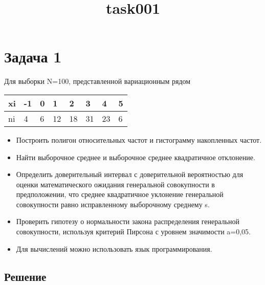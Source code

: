 \documentclass[11pt]{article}
\title{task001}
\begin{document}
    
    \maketitle
    
    

    
    \section{Задача 1}\label{ux437ux430ux434ux430ux447ux430-1}

Для выборки N=100, представленной вариационным рядом

\begin{longtable}[]{@{}llllllll@{}}
\toprule\noalign{}
xi & -1 & 0 & 1 & 2 & 3 & 4 & 5 \\
\midrule\noalign{}
\endhead
\bottomrule\noalign{}
\endlastfoot
ni & 4 & 6 & 12 & 18 & 31 & 23 & 6 \\
\end{longtable}

\begin{itemize}
\item
  Построить полигон относительных частот и гистограмму накопленных
  частот.
\item
  Найти выборочное среднее и выборочное среднее квадратичное отклонение.
\item
  Определить доверительный интервал с доверительной вероятностью
   для оценки математического ожидания генеральной
  совокупности в предположении, что среднее квадратичное уклонение
  генеральной совокупности равно исправленному выборочному среднему s.
\item
  Проверить гипотезу о нормальности закона распределения генеральной
  совокупности, используя критерий Пирсона с уровнем значимости a=0,05.
\item
  Для вычислений можно использовать язык программирования.
\end{itemize}

\subsection{Решение}\label{ux440ux435ux448ux435ux43dux438ux435}
\end{document}
